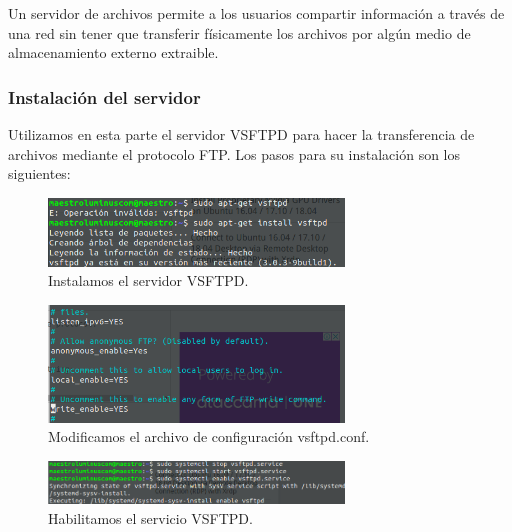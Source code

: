 Un servidor de archivos permite a los usuarios compartir información a través de una red sin tener que transferir físicamente los archivos por algún medio de almacenamiento externo extraible.
\subsubsection{Instalación del servidor}
Utilizamos en esta parte el servidor VSFTPD para hacer la transferencia de archivos mediante el protocolo FTP. Los pasos para su instalación son los siguientes:
\begin{figure}[!htbp]
	\hypertarget{fig:instalacionFTP}{\hspace{1pt}}
	\begin{center}
		\includegraphics[width=0.7\textwidth]{desarrollo/tarea2/img/instalacionFTP.png}
		\caption{Instalamos el servidor VSFTPD.}
		\label{fig:instalacionFTP}
	\end{center}
\end{figure}
\pagebreak
\begin{figure}[!htbp]
	\hypertarget{fig:modificarFTP}{\hspace{1pt}}
	\begin{center}
		\includegraphics[width=0.7\textwidth]{desarrollo/tarea2/img/modificarFTP.png}
		\caption{Modificamos el archivo de configuración vsftpd.conf.}
		\label{fig:modificarFTP}
	\end{center}
\end{figure}
\pagebreak
\begin{figure}[!htbp]
	\hypertarget{fig:servicioFTP}{\hspace{1pt}}
	\begin{center}
		\includegraphics[width=0.7\textwidth]{desarrollo/tarea2/img/servicioFTP.png}
		\caption{Habilitamos el servicio VSFTPD.}
		\label{fig:servicioFTP}
	\end{center}
\end{figure}
